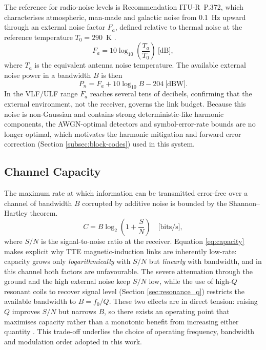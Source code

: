The reference for radio-noise levels is Recommendation ITU-R~P.372, which
characterises atmospheric, man-made and galactic noise from 0.1~Hz upward through
an external noise factor $F_a$, defined relative to thermal noise at the reference
temperature $T_0 = 290$~K \cite{itur_p372}.
\begin{equation}
    F_a = 10\log_{10}\!\left(\frac{T_a}{T_0}\right) \ \text{[dB]},
    \label{eq:noise_factor}
\end{equation}
where $T_a$ is the equivalent antenna noise temperature. The available external
noise power in a bandwidth $B$ is then
\begin{equation}
    P_n = F_a + 10\log_{10} B - 204 \ \text{[dBW]}.
    \label{eq:noise_power}
\end{equation}
In the VLF/ULF range $F_a$ reaches several tens of decibels, confirming that the
external environment, not the receiver, governs the link budget. Because this
noise is non-Gaussian and contains strong deterministic-like harmonic components,
the AWGN-optimal detectors and symbol-error-rate bounds are no longer optimal, which motivates the harmonic mitigation and forward error correction (Section \ref{subsec:block-codes}) used in this system.

\subsection{Channel Capacity}
\label{sec:capacity}

The maximum rate at which information can be transmitted error-free over a channel
of bandwidth $B$ corrupted by additive noise is bounded by the Shannon--Hartley
theorem.
\begin{equation}
    C = B \log_2\!\left(1 + \frac{S}{N}\right) \quad \text{[bits/s]},
    \label{eq:capacity}
\end{equation}
where $S/N$ is the signal-to-noise ratio at the receiver. Equation \eqref{eq:capacity}
makes explicit why TTE magnetic-induction links are inherently low-rate: capacity
grows only \emph{logarithmically} with $S/N$ but \emph{linearly} with bandwidth,
and in this channel both factors are unfavourable. The severe attenuation through
the ground and the high external noise keep $S/N$
low, while the use of high-$Q$ resonant coils to recover signal level
(Section \ref{sec:resonance_q}) restricts the available bandwidth to
$B = f_0/Q$. These two effects are in direct tension: raising $Q$ improves $S/N$
but narrows $B$, so there exists an operating point that maximises capacity rather
than a monotonic benefit from increasing either quantity \cite{jing2008, agbinya2012power}.
This trade-off underlies the choice of operating frequency, bandwidth and
modulation order adopted in this work.

